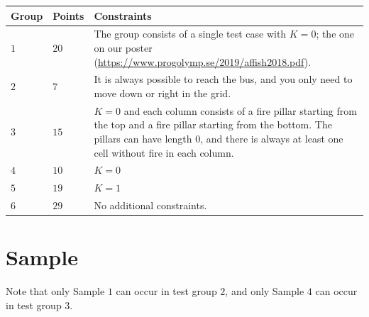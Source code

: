 \noindent
\begin{tabular}{| l | l | l |}
\hline
Group & Points & Constraints \\ \hline
$1$    & $20$        &  The group consists of a single test case with $K = 0$; the one on our poster (\url{https://www.progolymp.se/2019/affish2018.pdf}). \\ \hline
$2$    & $7$        &  It is always possible to reach the bus, and you only need to move down or right in the grid. \\ \hline
$3$    & $15$        &  $K = 0$ and each column consists of a fire pillar starting from the top and a fire pillar starting from the bottom. The pillars can have length $0$, and there is always at least one cell without fire in each column. \\ \hline
$4$    & $10$        &  $K = 0$ \\ \hline
$5$    & $19$        &  $K = 1$ \\ \hline
$6$    & $29$       &  No additional constraints. \\ \hline
\end{tabular}

\section*{Sample}
Note that only Sample $1$ can occur in test group $2$, and only Sample $4$ can occur in test group $3$.
